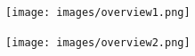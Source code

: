 \documentclass[landscape, DIV=99, 14pt]{scrartcl}
\begin{document}
\pagebreak



\pagebreak

\onecolumn
\null
\vfill 
\texttt{[image: images/overview1.png]}

\null
\vspace{0.8cm}
\texttt{[image: images/overview2.png]}
\vfill 
\end{document}
